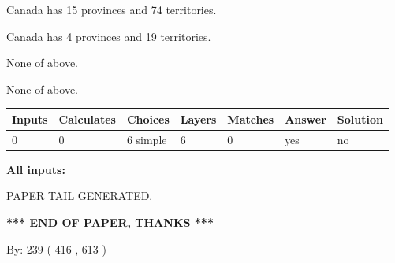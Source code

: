 \documentclass[12pt]{article}
\begin{document}
 
Canada has  15 provinces and  74 territories.
 
 
Canada has   4 provinces and  19 territories.
 
 
 None of above.
 
 
\noindent{}
 
 
 None of above.
 
 
\noindent{}
 
 
   
   
   
   
\noindent\begin{tabular}{|l|l|l|l|l|l|l|}
 \hline
Inputs & Calculates & Choices & Layers & Matches & Answer & Solution \\ \hline
 0  & 
 0  & 
 6
  simple  
  & 
 6  & 
 0  & 
  yes & 
  no 
  \\ \hline
 \end{tabular}
   
   
   
   
\noindent{}
   
   
   
   
\noindent\vspace{0.1in}\hspace{-0.08in} {\textbf{\Large{All inputs: }}}
   
   
   
   
   
   
 \vspace{0.2in}
 
   
   
\vspace{2.0in} PAPER TAIL GENERATED.
   
   
   
   
\vspace{1.0in} 
{\textbf{\large{ *** END OF PAPER, THANKS *** }}} 
   
   
\hspace{1.0in} By: 
 239 ( 416 ,  613 )
   
   
   
   
\newpage 
\setcounter{page}{ 
   486001 } 
   
   
   
\end{document}
